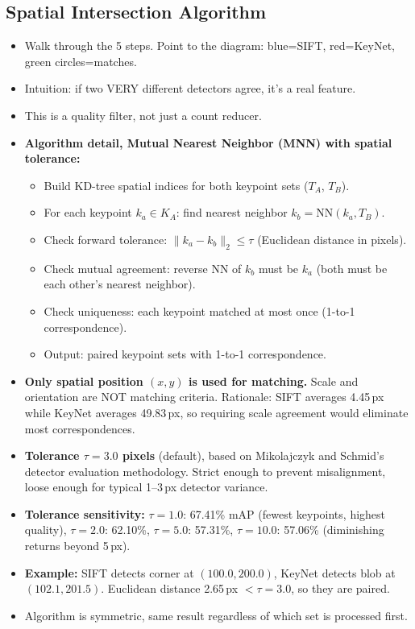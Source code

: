 \documentclass[11pt, letterpaper]{article}
\begin{document}
\subsection{Spatial Intersection Algorithm}
\begin{itemize}
  \item Walk through the 5 steps. Point to the diagram: blue=SIFT, red=KeyNet, green circles=matches.
  \item Intuition: if two VERY different detectors agree, it's a real feature.
  \item This is a quality filter, not just a count reducer.
  \item \textbf{Algorithm detail, Mutual Nearest Neighbor (MNN) with spatial tolerance:}
    \begin{itemize}
      \item Build KD-tree spatial indices for both keypoint sets ($T_A$, $T_B$).
      \item For each keypoint $k_a \in K_A$: find nearest neighbor $k_b = \text{NN}(k_a, T_B)$.
      \item Check forward tolerance: $\|k_a - k_b\|_2 \leq \tau$ (Euclidean distance in pixels).
      \item Check mutual agreement: reverse NN of $k_b$ must be $k_a$ (both must be each other's nearest neighbor).
      \item Check uniqueness: each keypoint matched at most once (1-to-1 correspondence).
      \item Output: paired keypoint sets with 1-to-1 correspondence.
    \end{itemize}
  \item \textbf{Only spatial position $(x, y)$ is used for matching.} Scale and orientation are NOT matching criteria. Rationale: SIFT averages 4.45\,px while KeyNet averages 49.83\,px, so requiring scale agreement would eliminate most correspondences.
  \item \textbf{Tolerance $\tau = 3.0$ pixels} (default), based on Mikolajczyk and Schmid's detector evaluation methodology. Strict enough to prevent misalignment, loose enough for typical 1--3\,px detector variance.
  \item \textbf{Tolerance sensitivity:} $\tau=1.0$: 67.41\% mAP (fewest keypoints, highest quality), $\tau=2.0$: 62.10\%, $\tau=5.0$: 57.31\%, $\tau=10.0$: 57.06\% (diminishing returns beyond 5\,px).
  \item \textbf{Example:} SIFT detects corner at $(100.0, 200.0)$, KeyNet detects blob at $(102.1, 201.5)$. Euclidean distance 2.65\,px $< \tau=3.0$, so they are paired.
  \item Algorithm is symmetric, same result regardless of which set is processed first.
\end{itemize}
\end{document}
